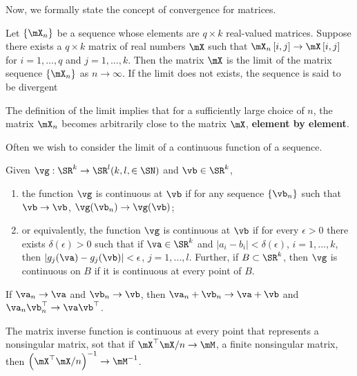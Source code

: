 \documentclass[english,12pt]{book}\usepackage[]{graphicx}\usepackage[]{xcolor}
\begin{document}
Now, we formally state the concept of convergence for matrices. 

\begin{definition}
Let $\left\lbrace\mX_n \right\rbrace$ be a sequence whose elements are $q\times k$ real-valued matrices. Suppose there exists a $q\times k$ matrix of real numbers $\mX$ such that $\mX_n\left[i, j\right]\to \mX\left[i, j\right]$ for $i = 1,...,q$ and $j = 1,...,k$. Then the matrix $\mX$ is the limit of the matrix sequence $\left\lbrace\mX_n \right\rbrace$ as $n\to \infty$. If the limit does not exists, the sequence is said to be divergent
\end{definition}

The definition of the limit implies that for a sufficiently large choice of $n$, the matrix $\mX_n$ becomes arbitrarily close to the matrix $\mX$, \textbf{element by element}.

Often we wish to consider the limit of a continuous function of a sequence. 

\begin{definition}
Given $\vg:\SR^k\to \SR^l(k,l, \in \SN)$ and $\vb\in \SR^k$, 

\begin{enumerate}
\item the function $\vg$ is continuous at $\vb$ if for any sequence $\lbrace \vb_n \rbrace$ such that $\vb\to \vb$, $\vg(\vb_n)\to \vg(\vb)$;
\item or equivalently, the function $\vg$ is continuous at $\vb$ if for every $\epsilon > 0$ there exists $\delta(\epsilon)>0$ such that if $\va \in \SR^k$ and $\left|a_i - b_i\right|< \delta(\epsilon)$, $i = 1, ..., k$, then $\left|g_j(\va)- g_j(\vb)\right|<\epsilon$, $j = 1, ..., l$. Further, if $B\subset \SR^k$, then $\vg$ is continuous on $B$ if it is continuous at every point of $B$. 
\end{enumerate}
\end{definition}

\begin{example}
If $\va_n \to \va$ and $\vb_n\to \vb$, then $\va_n + \vb_n\to \va + \vb$ and $\va_n\vb_n^\top\to\va\vb^\top$. 
\end{example}

\begin{example}
The matrix inverse function is continuous at every point that represents a nonsingular matrix, sot that if $\mX^\top\mX/n\to \mM$, a finite nonsingular matrix, then $\left(\mX^\top\mX/n\right)^{-1}\to \mM^{-1}$.
\end{example}
\end{document}
